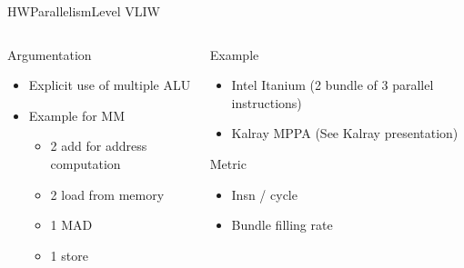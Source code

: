 %
\begin{Frame}{HWParallelismLevel VLIW}
  \begin{columns}[t]
    \begin{column}{\HW} %
      \begin{block}{Argumentation}
        \begin{itemize}
        \item Explicit use of multiple ALU
        \item Example for MM
          \begin{itemize}
          \item 2 add for address computation
          \item 2 load from memory
          \item 1 MAD
          \item 1 store
          \end{itemize}
        \end{itemize}
      \end{block} 
    \end{column}
    
    \begin{column}{\HW} %
      \begin{block}{Example}
        \begin{itemize}
        \item Intel Itanium (2 bundle of 3 parallel instructions)
        \item Kalray MPPA (See Kalray presentation)
        \end{itemize}
      \end{block}   
      \begin{alertblock}{Metric}
        \begin{itemize}
        \item Insn / cycle
        \item Bundle filling rate
        \end{itemize}
      \end{alertblock}   
    \end{column}
  \end{columns}  
\end{Frame}


